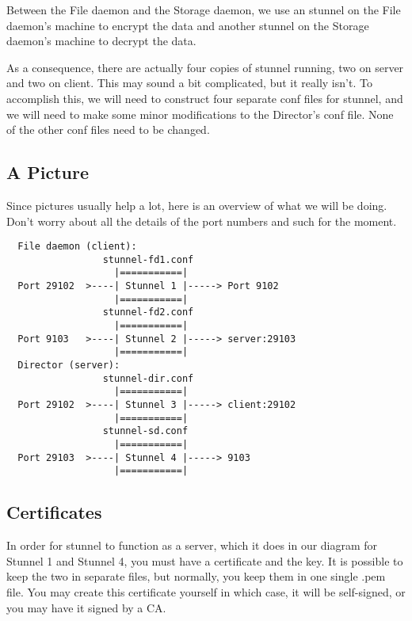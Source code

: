 Between the File daemon and the Storage daemon, we use an stunnel on the File
daemon's machine to encrypt the data and another stunnel on the Storage
daemon's machine to decrypt the data. 

As a consequence, there are actually four copies of stunnel running, two on
server and two on client. This may sound a bit complicated, but it really
isn't. To accomplish this, we will need to construct four separate conf files
for stunnel, and we will need to make some minor modifications to the
Director's conf file. None of the other conf files need to be changed. 

\subsection*{A Picture}

Since pictures usually help a lot, here is an overview of what we will be
doing. Don't worry about all the details of the port numbers and such for the
moment. 

\footnotesize
\begin{verbatim}
  File daemon (client):
                 stunnel-fd1.conf
                   |===========|
  Port 29102  >----| Stunnel 1 |-----> Port 9102
                   |===========|
                 stunnel-fd2.conf
                   |===========|
  Port 9103   >----| Stunnel 2 |-----> server:29103
                   |===========|
  Director (server):
                 stunnel-dir.conf
                   |===========|
  Port 29102  >----| Stunnel 3 |-----> client:29102
                   |===========|
                 stunnel-sd.conf
                   |===========|
  Port 29103  >----| Stunnel 4 |-----> 9103
                   |===========|
\end{verbatim}
\normalsize

\subsection*{Certificates}

In order for stunnel to function as a server, which it does in our diagram for
Stunnel 1 and Stunnel 4, you must have a certificate and the key. It is
possible to keep the two in separate files, but normally, you keep them in one
single .pem file. You may create this certificate yourself in which case, it
will be self-signed, or you may have it signed by a CA. 

